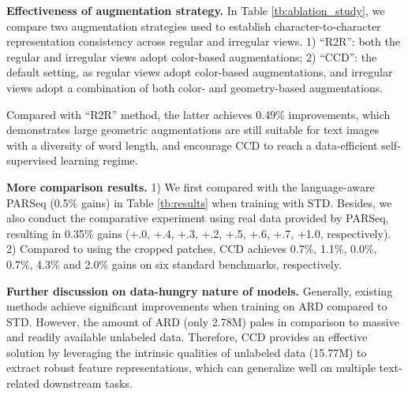 \documentclass[10pt,twocolumn,letterpaper]{article}
\begin{document}
\noindent \textbf{Effectiveness of augmentation strategy.} 
In Table \ref{tb:ablation_study}, we compare two augmentation strategies used to establish character-to-character representation consistency across regular and irregular views. 1) ``R2R'': both the regular and irregular views adopt color-based augmentations; 2) ``CCD'': the default setting, as regular views adopt color-based augmentations, and irregular views adopt a combination of both color- and geometry-based augmentations.

Compared with ``R2R'' method, the latter achieves 0.49\% improvements, which demonstrates large geometric augmentations are still suitable for text images with a diversity of word length, and encourage CCD to reach a data-efficient self-supervised learning regime.

\noindent \textbf{More comparison results.}
1) We first compared with the language-aware PARSeq (0.5\% gains) in Table \ref{tb:results} when training with STD. 
Besides, we also conduct the comparative experiment using real data provided by PARSeq, resulting in 0.35\% gains (+.0, +.4, +.3, +.2, +.5, +.6, +.7, +1.0, respectively).
2) Compared to using the cropped patches, CCD achieves 0.7\%, 1.1\%, 0.0\%, 0.7\%, 4.3\% and 2.0\% gains on six standard benchmarks, respectively.

\noindent \textbf{Further discussion on data-hungry nature of models.}
Generally, existing methods achieve significant improvements when training on ARD compared to STD. However, the amount of ARD (only 2.78M) pales in comparison to massive and readily available unlabeled data. Therefore, CCD provides an effective solution by leveraging the intrinsic qualities of unlabeled data (15.77M) to extract robust feature representations, which can generalize well on multiple text-related downstream tasks. 


\begin{table}[t]
\centering
\caption{}
\label{tb:ablation_study}
\end{table}
\end{document}
